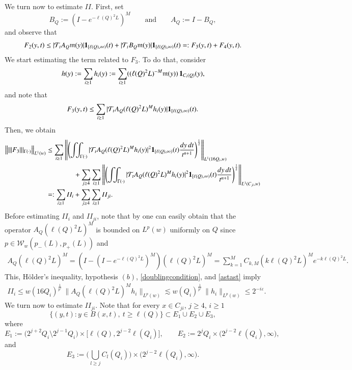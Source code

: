 \documentclass[11pt, a4paper,leqno]{amsart}
\newcommand{\mm}{\mathfrak{m}}
\renewcommand{\chi}{{\bf 1}}
\theoremstyle{plain}
\theoremstyle{definition}
\theoremstyle{remark}
\numberwithin{equation}{section}
\def \iint{\int\!\!\!\int}
\begin{document}
We turn now to estimate $II$. First, set
$$
B_Q:=\left(I-e^{-\ell(Q)^2L}\right)^M \qquad \textrm{and}\qquad A_{Q}:=I-B_Q,
$$
and observe that
\begin{align}\label{acotacionmoleculasII}
F_2(y,t)
\le
|\mathcal{T}_tA_Q\mm(y)|\chi_{[\ell(Q),\infty)}(t)+
|\mathcal{T}_tB_Q\mm(y)|\chi_{[\ell(Q),\infty)}(t)=:F_3(y,t)+F_4(y,t).
\end{align}
We start estimating the term related to $F_3$. To do that, consider
$$
h(y):=\sum_{i\ge 1} h_i(y)
:=
\sum_{i\ge 1}((\ell(Q)^2L)^{-M}\mm(y)) \,\chi_{C_i(Q)}(y)
,
$$
and note that
$$
F_3(y,t)
\leq
\sum_{i\geq 1}|\mathcal{T}_tA_Q(\ell(Q)^2L)^Mh_i(y)|\chi_{[\ell(Q),\infty)}(t).
$$
Then, we obtain
\begin{align*}
\big\||\|F_3\||_{\Gamma(\cdot)}\big\|_{L^1(w)}
&\leq
\sum_{i\geq1} \left\|\left(\iint_{\Gamma(\cdot)}|\mathcal{T}_tA_Q(\ell(Q)^2L)^Mh_i(y)|^2\chi_{[\ell(Q),\infty)}(t)\frac{dy\,dt}{t^{n+1}}\right)^{\frac{1}{2}}\right\|_{L^1(16Q_i,w)}
\\
&\qquad\qquad+\sum_{j\geq 4}
\sum_{i\geq 1} \left\|\left(\iint_{\Gamma(\cdot)}|\mathcal{T}_tA_Q(\ell(Q)^2L)^Mh_i(y)|^2\chi_{[\ell(Q),\infty)}(t)\frac{dy\,dt}{t^{n+1}}\right)^{\frac{1}{2}}\right\|_{L^1(C_{ji},w)}
\\
&=:
\sum_{i\geq 1}II_i
+\sum_{j\geq 4}
\sum_{i\geq 1}II_{ji}.
\end{align*}
Before estimating $II_i$ and $II_{ji}$, note that by \cite[Proposition 5.8]{AuscherMartell:II} one can easily obtain that the operator $A_Q(\ell(Q)^2L)^M$ is bounded on $L^p(w)$ uniformly on $Q$ since $p\in \mathcal{W}_w(p_-(L),p_+(L))$ and
\begin{align*}
A_Q(\ell(Q)^2L)^M
=
(I-(I-e^{-\ell(Q)^2L})^M)(\ell(Q)^2L)^M
=\sum_{k=1}^{M}C_{k,M} (k\ell(Q)^2 L)^M e^{-k\ell(Q)^2L}.
\end{align*}
This, H\"older's inequality,  hypothesis $(b)$, \eqref{doublingcondition}, and \eqref{astast} imply
\begin{align}\label{Ii-1}
II_i
\leq
w(16Q_i)^{\frac1{p'}}\,\|A_Q(\ell(Q)^2L)^Mh_i\|_{L^p(w)}
\lesssim
w(Q_i)^{\frac1{p'}}\, \|h_i\|_{L^p(w)}
\leq
2^{-i\varepsilon}.
\end{align}
We turn now to estimate $II_{ji}$. Note that for every $x\in C_{ji}$, $j\geq 4$, $i\geq 1$
$$
\big\{(y,t):y\in B(x,t), \ t\geq\ell(Q)\big\}
\subset E_1\cup E_2\cup E_3,
$$
where
$$
E_1:=\big(2^{j+2}Q_i\setminus 2^{j-1}Q_i\big)\times \big[\ell(Q),2^{j-2}\ell(Q_i)\big],
\qquad
E_2:=
2^{j}Q_i\times \big(2^{j-2}\ell(Q_i),\infty\big),
$$
and
$$
E_3:=
\Big(\bigcup_{l\geq j}C_l(Q_i)\Big)\times \big(2^{j-2}\ell(Q_i),\infty\Big).
$$
\end{document}
